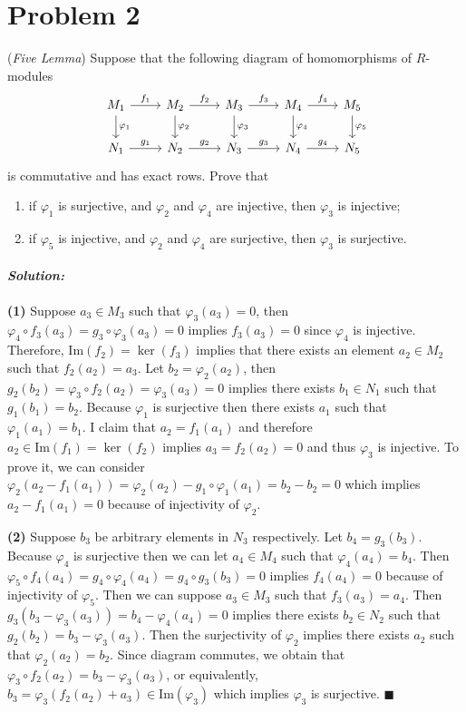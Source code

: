 \documentclass[12pt, a4paper]{article}
\theoremstyle{remark}
\newenvironment{solution}
  {\paragraph{\textit{Solution:}}\par\medskip}
  {\hfill$\blacksquare$\vspace{0.1cm}}
\begin{document}
\section*{Problem 2}
(\textit{Five Lemma}) Suppose that the following diagram of homomorphisms of $R$-modules
\[\begin{tikzcd}
    M_1 \arrow[r,"f_1"] \arrow[d, "\varphi_1"] & M_2 \arrow[r,"f_2"] \arrow[d, "\varphi_2"] & M_3 \arrow[r,"f_3"] \arrow[d, "\varphi_3"] & M_4 \arrow[r,"f_4"] \arrow[d, "\varphi_4"] & M_5 \arrow[d, "\varphi_5"] \\
    N_1 \arrow[r,"g_1"] & N_2 \arrow[r,"g_2"] & N_3 \arrow[r,"g_3"] & N_4 \arrow[r,"g_4"] & N_5
\end{tikzcd}\]
is commutative and has exact rows. Prove that
\begin{enumerate}
    \item[(1)] if $\varphi_1$ is surjective, and $\varphi_2$ and $\varphi_4$ are injective, then $\varphi_3$ is injective;
    \item[(2)] if $\varphi_5$ is injective, and $\varphi_2$ and $\varphi_4$ are surjective, then $\varphi_3$ is surjective.
\end{enumerate}

\begin{solution}
    \textbf{(1)} Suppose $a_3\in M_3$ such that $\varphi_3(a_3) = 0$, then $\varphi_4\circ f_3(a_3) = g_3\circ \varphi_3(a_3)=0$ implies $f_3(a_3)=0$
    since $\varphi_4$ is injective. Therefore, $\text{Im}(f_2)=\ker(f_3)$ implies that there exists an element $a_2\in M_2$ such that $f_2(a_2)=a_3$.
    Let $b_2 = \varphi_2(a_2)$, then $g_2(b_2) = \varphi_3\circ f_2(a_2)= \varphi_3(a_3)=0$ implies there exists $b_1\in N_1$ such that $g_1(b_1)=b_2$. 
    Because $\varphi_1$ is surjective then there exists $a_1$ such that $\varphi_1(a_1)=b_1$. I claim that $a_2=f_1(a_1)$ and therefore $a_2\in \text{Im}(f_1)=\ker(f_2)$ implies
    $a_3=f_2(a_2)=0$ and thus $\varphi_3$ is injective. To prove it, we can consider $\varphi_2(a_2-f_1(a_1))=\varphi_2(a_2) - g_1\circ \varphi_{1}(a_1) = b_2-b_2=0$  which 
    implies $a_2-f_1(a_1)=0$ because of injectivity of $\varphi_2$.
    
    \textbf{(2)} Suppose $b_3$ be arbitrary elements in $N_3$ respectively. Let $b_4=g_3(b_3)$. Because $\varphi_4$ is surjective 
    then we can let $a_4 \in M_4$ such that $\varphi_4(a_4)=b_4$. Then $\varphi_5\circ f_4(a_4)=g_4\circ \varphi_4(a_4) = g_4\circ g_3(b_3) = 0$ implies 
    $f_4(a_4)=0$ because of injectivity of $\varphi_5$. Then we can suppose $a_3\in M_3$ such that $f_3(a_3)= a_4$. Then $g_3(b_3-\varphi_3(a_3))= b_4-\varphi_4(a_4)=0$ implies 
    there exists $b_2\in N_2$ such that $g_2(b_2) = b_3-\varphi_3(a_3)$. Then the surjectivity of $\varphi_2$ implies there exists $a_2$ such that $\varphi_2(a_2)=b_2$.
    Since diagram commutes, we obtain that $\varphi_3\circ f_2(a_2) = b_3-\varphi_3(a_3)$, or equivalently, $b_3 = \varphi_3(f_2(a_2)+a_3)\in \text{Im}(\varphi_3)$ which implies $\varphi_3$ is 
    surjective.
\end{solution}
\end{document}

